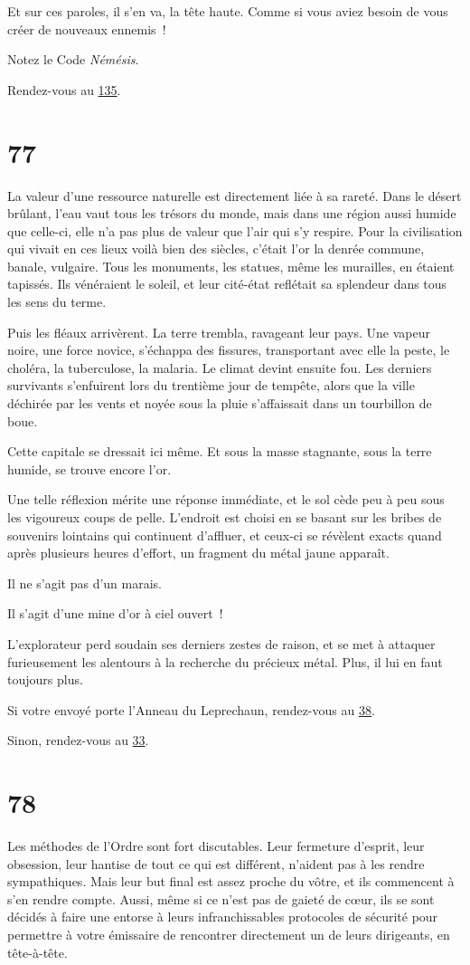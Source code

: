 \documentclass{report}
\newcommand{\gsection}[1]{
    \section{#1}
    \label{section-#1}
}
\newcommand{\glink}[1]{\hyperref[section-#1]{#1}}
\begin{document}
Et sur ces paroles, il s'en va, la tête haute. Comme si vous aviez besoin de vous créer de nouveaux ennemis !

Notez le Code \emph{Némésis}.

Rendez-vous au \glink{135}.

\gsection{77}

La valeur d'une ressource naturelle est directement liée à sa rareté. Dans le désert brûlant, l'eau vaut tous les trésors du monde, mais dans une région aussi humide que celle-ci, elle n'a pas plus de valeur que l'air qui s'y respire. Pour la civilisation qui vivait en ces lieux voilà bien des siècles, c'était l'or la denrée commune, banale, vulgaire. Tous les monuments, les statues, même les murailles, en étaient tapissés. Ils vénéraient le soleil, et leur cité-état reflétait sa splendeur dans tous les sens du terme.

Puis les fléaux arrivèrent. La terre trembla, ravageant leur pays. Une vapeur noire, une force novice, s'échappa des fissures, transportant avec elle la peste, le choléra, la tuberculose, la malaria. Le climat devint ensuite fou. Les derniers survivants s'enfuirent lors du trentième jour de tempête, alors que la ville déchirée par les vents et noyée sous la pluie s'affaissait dans un tourbillon de boue.

Cette capitale se dressait ici même. Et sous la masse stagnante, sous la terre humide, se trouve encore l'or.

Une telle réflexion mérite une réponse immédiate, et le sol cède peu à peu sous les vigoureux coups de pelle. L'endroit est choisi en se basant sur les bribes de souvenirs lointains qui continuent d'affluer, et ceux-ci se révèlent exacts quand après plusieurs heures d'effort, un fragment du métal jaune apparaît.

Il ne s'agit pas d'un marais.

Il s'agit d'une mine d'or à ciel ouvert !

L'explorateur perd soudain ses derniers zestes de raison, et se met à attaquer furieusement les alentours à la recherche du précieux métal. Plus, il lui en faut toujours plus.

Si votre envoyé porte l'Anneau du Leprechaun, rendez-vous au \glink{38}.

Sinon, rendez-vous au \glink{33}.

\gsection{78}

Les méthodes de l'Ordre sont fort discutables. Leur fermeture d'esprit, leur obsession, leur hantise de tout ce qui est différent, n'aident pas à les rendre sympathiques. Mais leur but final est assez proche du vôtre, et ils commencent à s'en rendre compte. Aussi, même si ce n'est pas de gaieté de cœur, ils se sont décidés à faire une entorse à leurs infranchissables protocoles de sécurité pour permettre à votre émissaire de rencontrer directement un de leurs dirigeants, en tête-à-tête.
\end{document}
